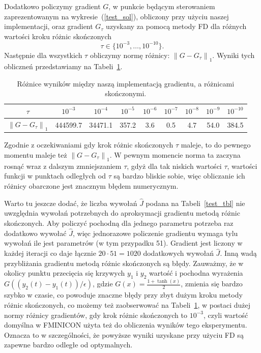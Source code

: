 \documentclass[11pt]{article}
\newcommand{\norm}[1]{\left\lVert#1\right\rVert}
\begin{document}
Dodatkowo policzymy gradient $G$, w punkcie będącym sterowaniem zaprezentowanym na wykresie~(\ref{test_sol}), obliczony przy użyciu naszej implementacji, oraz gradient $G_\tau$ uzyskany za pomocą metody FD dla różnych wartości kroku różnic skończonych
\[\tau \in \{10^{-3},\ldots,10^{-10}\}.\]
Następnie dla wszystkich $\tau$ obliczymy normę różnicy: $\norm{G - G_\tau}_1$. Wyniki tych obliczneń przedstawiamy na Tabeli~\ref{grad_fd_tbl}.

\begin{table}[h!]
  \begin{center}
    \begin{tabular}{|c|c|c|c|c|c|c|c|c|}
      \hline
      $\tau$ & $10^{-3}$ & $10^{-4}$ & $10^{-5}$ & $10^{-6}$ & $10^{-7}$ & $10^{-8}$ & $10^{-9}$ & $10^{-10}$ \\
      \hline
      $\norm{G - G_\tau}_1$ & 444599.7 & 34471.1 & 357.2 & 3.6 & 0.5 & 4.7 & 54.0 & 384.5 \\
      \hline
    \end{tabular}
    \caption{Różnice wyników między naszą implementacją gradientu, a różnicami skończonymi.}\label{grad_fd_tbl}
  \end{center}
\end{table}

Zgodnie z oczekiwaniami gdy krok różnic skończonych $\tau$ maleje, to do pewnego momentu maleje też $\norm{G - G_\tau}_1$. W pewnym momencie norma ta zaczyna rosnąć wraz z dalszym zmniejszaniem $\tau$, gdyż dla tak niskich wartości $\tau$, wartości funkcji w punktach odległych od $\tau$ są bardzo bliskie sobie, więc obliczanie ich różnicy obarczone jest znacznym błędem numerycznym.

Warto tu jeszcze dodać, że liczba wywołań $\hat{J}$ podana na Tabeli~\ref{test_tbl} nie uwzględnia wywołań potrzebnych do aproksymacji gradientu metodą różnic skończonych. Aby policzyć pochodną dla jednego parametru potrzeba raz dodatkowo wywołać $\hat{J}$, więc jednorazowe policzenie gradientu wymaga tylu wywołań ile jest parametrów (w tym przypadku 51). Gradient jest liczony w każdej iteracji co daje łącznie $20\cdot 51 = 1020$ dodatkowych wywołań $\hat{J}$. Inną wadą przybliżania gradientu metodą różnic skończonych są błędy. Zauważmy, że w okolicy punktu przecięcia się krzywych $y_1$ i $y_2$ wartość i pochodna wyrażenia $G((y_2(t) - y_1(t))/\epsilon)$, gdzie $G(x) = \frac{1 + \tanh(x)}{2}$, zmienia się bardzo szybko w czasie, co powoduje znaczne błędy przy zbyt dużym kroku metody różnic skończonych, co możemy też zaobserwować na Tabeli~\ref{grad_fd_tbl}, w postaci dużej normy różnicy gradientów, gdy krok różnic skończonych to $10^{-3}$, czyli wartość domyślna w FMINICON użyta też do obliczenia wyników tego eksperymentu. Oznacza to w szczególności, że powyższe wyniki uzyskane przy użyciu FD są zapewne bardzo odległe od optymalnych.
\end{document}
